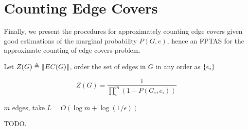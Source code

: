 \section{Counting Edge Covers}

Finally, we present the procedures for approximately counting edge covers given good estimations of the marginal probability $P(G,e)$, hence an FPTAS for the approximate counting of edge covers problem.

\begin{Prop}
	
	Let $Z(G) \triangleq \left\Vert EC(G)\right\Vert$, order the set of edges in $G$ in any order as $\left\{e_i\right\}$

\[ Z(G) = \frac{1}{\prod_i^m (1 - P(G_i, e_i))} \]

\end{Prop}

$m$ edges, 
take $L=O(\log m + \log(1/ \epsilon))$

TODO.


